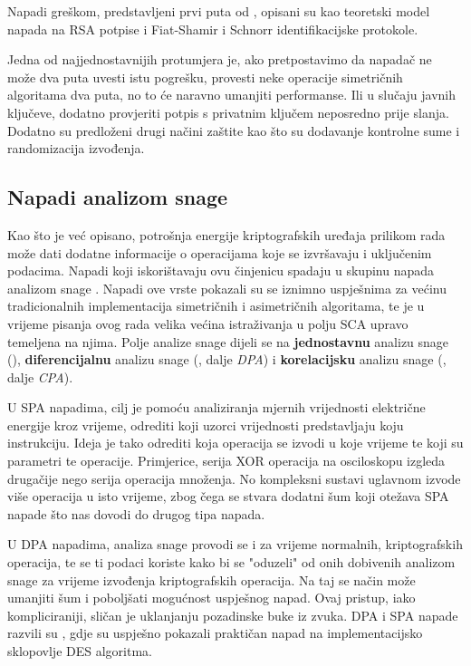 \documentclass[times, utf8, diplomski]{fer}
\begin{document}
Napadi greškom, predstavljeni prvi puta od \cite{boneh1997importance}, opisani su kao teoretski model napada na RSA potpise i Fiat-Shamir i Schnorr identifikacijske protokole.

Jedna od najjednostavnijih protumjera je, ako pretpostavimo da napadač ne može dva puta uvesti istu pogrešku, provesti neke operacije simetričnih algoritama dva puta, no to će naravno umanjiti performanse. Ili u slučaju javnih ključeve, dodatno provjeriti potpis s privatnim ključem neposredno prije slanja. Dodatno su predloženi drugi načini zaštite kao što su dodavanje kontrolne sume i randomizacija izvođenja.

\subsection{Napadi analizom snage}

Kao što je već opisano, potrošnja energije kriptografskih uređaja prilikom rada može dati dodatne informacije o operacijama koje se izvršavaju i uključenim podacima. Napadi koji iskorištavaju ovu činjenicu spadaju u skupinu napada analizom snage . Napadi ove vrste pokazali su se iznimno uspješnima za većinu tradicionalnih implementacija simetričnih i asimetričnih algoritama, te je u vrijeme pisanja ovog rada velika većina istraživanja u polju SCA upravo temeljena na njima. Polje analize snage dijeli se na \textbf{jednostavnu} analizu snage (), \textbf{diferencijalnu} analizu snage (, dalje \emph{DPA}) i \textbf{korelacijsku} analizu snage (, dalje \emph{CPA}).

U SPA napadima, cilj je pomoću analiziranja mjernih vrijednosti električne energije kroz vrijeme, odrediti koji uzorci vrijednosti predstavljaju koju instrukciju. Ideja je tako odrediti koja operacija se izvodi u koje vrijeme te koji su parametri te operacije. Primjerice, serija XOR operacija na osciloskopu izgleda drugačije nego serija operacija množenja. No kompleksni sustavi uglavnom izvode više operacija u isto vrijeme, zbog čega se stvara dodatni šum koji otežava SPA napade što nas dovodi do drugog tipa napada.

U DPA napadima, analiza snage provodi se i za vrijeme normalnih, kriptografskih operacija, te se ti podaci koriste kako bi se "oduzeli"
od onih dobivenih analizom snage za vrijeme izvođenja kriptografskih operacija. Na taj se način može umanjiti šum i poboljšati mogućnost uspješnog napad. Ovaj pristup, iako kompliciraniji, sličan je uklanjanju pozadinske buke iz zvuka. DPA i SPA napade razvili su \cite{kocher1999differential}, gdje su uspješno pokazali praktičan napad na implementacijsko sklopovlje DES algoritma.
\end{document}
